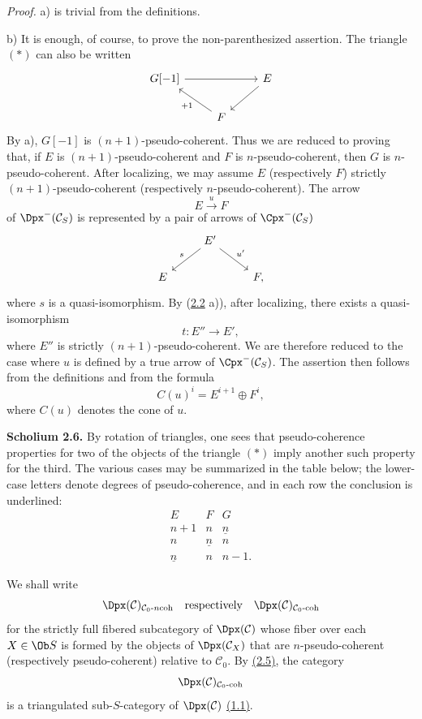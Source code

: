 \emph{Proof.} a) is trivial from the definitions.

b) It is enough, of course, to prove the non-parenthesized assertion. The triangle \((*)\) can also be written
\[
\begin{tikzcd}
G[-1] \arrow[rr] && E \arrow[dl]\\
& F \arrow[ul,"+1"] &
\end{tikzcd}
\]
By a), \(G[-1]\) is \((n+1)\)-pseudo-coherent. Thus we are reduced to proving that, if \(E\) is \((n+1)\)-pseudo-coherent and \(F\) is \(n\)-pseudo-coherent, then \(G\) is \(n\)-pseudo-coherent. After localizing, we may assume \(E\) (respectively \(F\)) strictly \((n+1)\)-pseudo-coherent (respectively \(n\)-pseudo-coherent). The arrow
\[
  E\xrightarrow{u}F
\]
of \(\Dpx^-(\mathcal C_S)\) is represented by a pair of arrows of \(\Cpx^-(\mathcal C_S)\)
\[
\begin{tikzcd}
& E' \arrow[dl,"s"'] \arrow[dr,"u'"]\\
E && F ,
\end{tikzcd}
\]
where \(s\) is a quasi-isomorphism. By (\hyperlink{sga6.e01.prop.2-2}{2.2} a)), after localizing, there exists a quasi-isomorphism
\[
  t:E''\longrightarrow E',
\]
where \(E''\) is strictly \((n+1)\)-pseudo-coherent. We are therefore reduced to the case where \(u\) is defined by a true arrow of \(\Cpx^-(\mathcal C_S)\). The assertion then follows from the definitions and from the formula
\[
  C(u)^i=E^{i+1}\oplus F^i,
\]
where \(C(u)\) denotes the cone of \(u\).

\textbf{Scholium 2.6.} By rotation of triangles, one sees that pseudo-coherence properties for two of the objects of the triangle \((*)\) imply another such property for the third. The various cases may be summarized in the table below; the lower-case letters denote degrees of pseudo-coherence, and in each row the conclusion is underlined:
\[
\begin{array}{ccc}
E&F&G\\[0.2em]
n+1&n&\underline n\\
n&\underline n&n\\
\underline n&n&n-1 .
\end{array}
\]

We shall write
\[
  \Dpx(\mathcal C)_{\mathcal C_0\text{-}n\mathrm{coh}}
  \quad\text{respectively}\quad
  \Dpx(\mathcal C)_{\mathcal C_0\text{-}\mathrm{coh}}
\]
for the strictly full fibered subcategory of \(\Dpx(\mathcal C)\) whose fiber over each \(X\in\Ob S\) is formed by the objects of \(\Dpx(\mathcal C_X)\) that are \(n\)-pseudo-coherent (respectively pseudo-coherent) relative to \(\mathcal C_0\). By \hyperlink{sga6.e01.prop.2-5}{(2.5)}, the category
\[
  \Dpx(\mathcal C)_{\mathcal C_0\text{-}\mathrm{coh}}
\]
is a triangulated sub-\(S\)-category of \(\Dpx(\mathcal C)\) \hyperlink{sga6.e01.sec.1.1}{(1.1)}.

